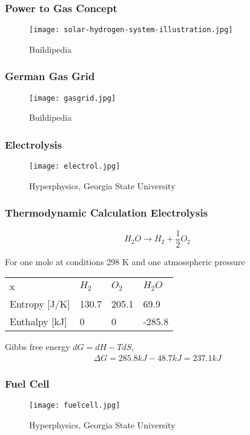 \documentclass[10pt,dvipsnames]{beamer}
\begin{document}
\begin{frame}
 \frametitle{Power to Gas Concept}
   \begin{figure}
     \texttt{[image: solar-hydrogen-system-illustration.jpg]}
  \caption{Buildipedia}
  \end{figure}
\end{frame}
\begin{frame}
 \frametitle{German Gas Grid}
   \begin{figure}
     \texttt{[image: gasgrid.jpg]}
  \caption{Buildipedia}
  \end{figure}
\end{frame}
\begin{frame}
  \frametitle{Electrolysis}

  \begin{figure}
     \texttt{[image: electrol.jpg]}
  \caption{Hyperphysics, Georgia State University}
  \end{figure}


\end{frame}
\begin{frame}
 \frametitle{Thermodynamic Calculation Electrolysis}
  \begin{equation*}
  H_2 O \rightarrow H_2 + \frac{1}{2} O_2
 \end{equation*}

 For one mole at conditions 298 K and one atmosspheric pressure

 \begin{table}
  \begin{center}
\begin{tabular}{llll}
x & $H_2$ & $O_2$ & $H_2 O$\\
Entropy [J/K] & 130.7 & 205.1 & 69.9\\
Enthalpy [kJ] & 0 & 0 & -285.8
  \end{tabular}
  \end{center}

 \end{table}

 Gibbs free energy $dG = dH - TdS$,
 \begin{align*}
 \Delta G = 285.8 kJ - 48.7 kJ = 237.1 kJ
 \end{align*}

\end{frame}


\begin{frame}
  \frametitle{Fuel Cell}

  \begin{figure}
     \texttt{[image: fuelcell.jpg]}
  \caption{Hyperphysics, Georgia State University}
  \end{figure}




\end{frame}
\end{document}
